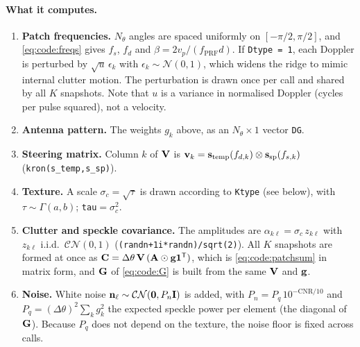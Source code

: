 \documentclass{article}
\begin{document}
\paragraph{What it computes.}
\begin{enumerate}
  \item \textbf{Patch frequencies.} $N_\theta$ angles are spaced uniformly on $[-\pi/2,\pi/2]$, and \eqref{eq:code:freqs} gives $f_s$, $f_d$ and $\beta=2v_p/(f_\mathrm{PRF}d)$. If \texttt{Dtype = 1}, each Doppler is perturbed by $\sqrt{u}\,\epsilon_k$ with $\epsilon_k\sim\mathcal N(0,1)$, which widens the ridge to mimic internal clutter motion. The perturbation is drawn once per call and shared by all $K$ snapshots. Note that $u$ is a variance in normalised Doppler (cycles per pulse squared), not a velocity.
  \item \textbf{Antenna pattern.} The weights $g_k$ above, as an $N_\theta\times1$ vector \texttt{DG}.
  \item \textbf{Steering matrix.} Column $k$ of $\mathbf{V}$ is $\vb v_k=\vb s_\text{temp}(f_{d,k})\otimes\vb s_\text{sp}(f_{s,k})$ (\texttt{kron(s\_temp,s\_sp)}).
  \item \textbf{Texture.} A scale $\sigma_{c}=\sqrt{\tau}$ is drawn according to \texttt{Ktype} (see below), with $\tau\sim\Gamma(a,b)$; \texttt{tau}$=\sigma_c^2$.
  \item \textbf{Clutter and speckle covariance.} The amplitudes are $\alpha_{k\ell}=\sigma_{c}\,z_{k\ell}$ with $z_{k\ell}$ i.i.d.\ $\mathcal{CN}(0,1)$ (\texttt{(randn+1i*randn)/sqrt(2)}). All $K$ snapshots are formed at once as $\mathbf{C} = \Delta\theta\,\mathbf{V}\,(\mathbf{A}\odot\vb g\vb 1^{\mathsf T})$, which is \eqref{eq:code:patchsum} in matrix form, and $\mathbf{G}$ of \eqref{eq:code:G} is built from the same $\mathbf{V}$ and $\vb g$.
  \item \textbf{Noise.} White noise $\vb n_\ell\sim\mathcal{CN}(\vb 0,P_n\mathbf{I})$ is added, with $P_n = P_q\,10^{-\mathrm{CNR}/10}$ and $P_q=(\Delta\theta)^2\sum_k g_k^2$ the expected speckle power per element (the diagonal of $\mathbf{G}$). Because $P_q$ does not depend on the texture, the noise floor is fixed across calls.
\end{enumerate}
\end{document}
